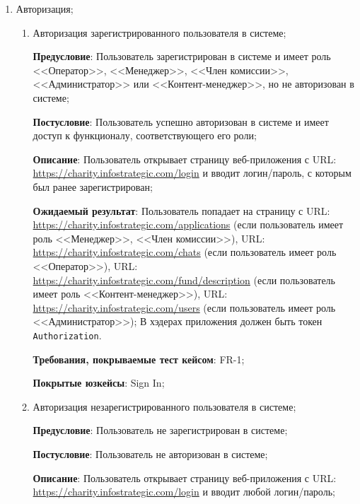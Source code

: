 \renewcommand{\labelenumi}{\textbf{TC-\arabic{enumi}}.}

\renewcommand{\labelenumii}{\textbf{TC-\arabic{enumi}.\arabic{enumii}}.}


\begin{enumerate}
    \item Авторизация;
    
    \begin{enumerate}
        \item Авторизация зарегистрированного пользователя в системе;
        
        \textbf{Предусловие}: Пользователь зарегистрирован в системе и имеет роль <<Оператор>>, <<Менеджер>>, <<Член комиссии>>, <<Администратор>> или <<Контент-менеджер>>, но не авторизован в системе; 
    
        \textbf{Постусловие}: Пользователь успешно авторизован в системе и имеет доступ к функционалу, соответствующего его роли;
        
        \textbf{Описание}: Пользователь открывает страницу веб-приложения с URL: \url{https://charity.infostrategic.com/login} и вводит логин/пароль, с которым был ранее зарегистрирован;
        
        \textbf{Ожидаемый результат}: Пользователь попадает на страницу с URL: \url{https://charity.infostrategic.com/applications} (если пользователь имеет роль <<Менеджер>>,  <<Член комиссии>>), URL: \url{https://charity.infostrategic.com/chats} (если пользователь имеет роль <<Оператор>>), URL: \url{https://charity.infostrategic.com/fund/description} (если пользователь имеет роль <<Контент-менеджер>>), URL: \url{https://charity.infostrategic.com/users} (если пользователь имеет роль <<Администратор>>); В хэдерах приложения должен быть токен \texttt{Authorization}.
        
        \textbf{Требования, покрываемые тест кейсом}: FR-1;
        
        \textbf{Покрытые юзкейсы}: Sign In;
        
        \item Авторизация незарегистрированного пользователя в системе;
        
        \textbf{Предусловие}: Пользователь не зарегистрирован в системе; 
    
        \textbf{Постусловие}: Пользователь не авторизован в системе;
        
        \textbf{Описание}: Пользователь открывает страницу веб-приложения с URL: \url{https://charity.infostrategic.com/login} и вводит любой логин/пароль;
        

\end{enumerate}
\end{enumerate}
